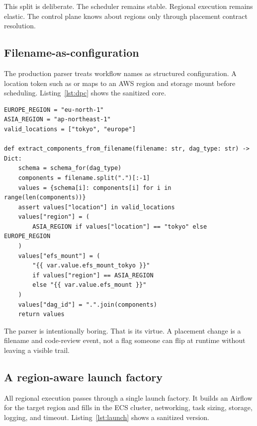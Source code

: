 \documentclass[11pt, reqno]{amsart}
\newcommand{\code}[1]{\texttt{\detokenize{#1}}}
\begin{document}
This split is deliberate. The scheduler remains stable. Regional execution remains elastic. The control plane knows about regions only through placement contract resolution.

\subsection{Filename-as-configuration}

The production parser treats workflow names as structured configuration. A location token such as \code{tokyo} or \code{europe} maps to an AWS region and storage mount before scheduling. Listing~\ref{lst:dpc} shows the sanitized core.

\begin{lstlisting}[style=python,caption={Sanitized deterministic placement contract. Workflow identity resolves to region and storage at parse time.},label={lst:dpc}]
EUROPE_REGION = "eu-north-1"
ASIA_REGION = "ap-northeast-1"
valid_locations = ["tokyo", "europe"]

def extract_components_from_filename(filename: str, dag_type: str) -> Dict:
    schema = schema_for(dag_type)
    components = filename.split(".")[:-1]
    values = {schema[i]: components[i] for i in range(len(components))}
    assert values["location"] in valid_locations
    values["region"] = (
        ASIA_REGION if values["location"] == "tokyo" else EUROPE_REGION
    )
    values["efs_mount"] = (
        "{{ var.value.efs_mount_tokyo }}"
        if values["region"] == ASIA_REGION
        else "{{ var.value.efs_mount }}"
    )
    values["dag_id"] = ".".join(components)
    return values
\end{lstlisting}

The parser is intentionally boring. That is its virtue. A placement change is a filename and code-review event, not a flag someone can flip at runtime without leaving a visible trail.

\subsection{A region-aware launch factory}

All regional execution passes through a single launch factory. It builds an Airflow \code{EcsRunTaskOperator} for the target region and fills in the ECS cluster, networking, task sizing, storage, logging, and timeout. Listing~\ref{lst:launch} shows a sanitized version.
\end{document}
